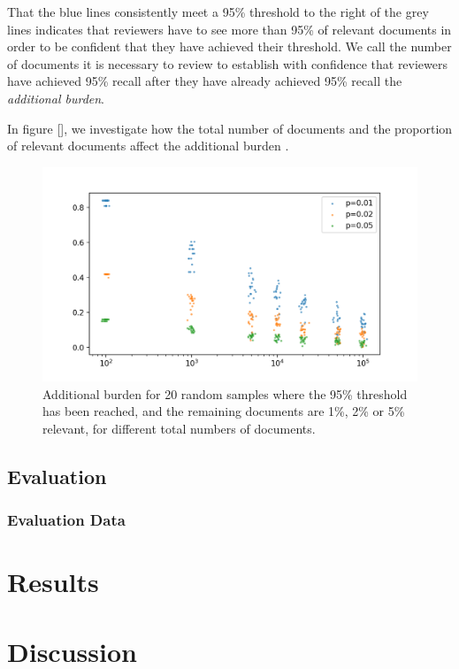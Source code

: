 \documentclass{bmcart}
\begin{document}
	That the blue lines consistently meet a 95\% threshold to the right of the grey lines indicates that reviewers have to see more than 95\% of relevant documents in order to be confident that they have achieved their threshold. We call the number of documents it is necessary to review to establish with confidence that reviewers have achieved 95\% recall after they have already achieved 95\% recall the \textit{additional burden}. 
	
	In figure [], we investigate how the total number of documents and the proportion of relevant documents affect the additional burden . 
	
	\begin{figure}
		\includegraphics[width=\linewidth]{../images/additional_burden}
		\caption{Additional burden for 20 random samples where the 95\% threshold has been reached, and the remaining documents are 1\%, 2\% or 5\% relevant, for different total numbers of documents.}
		\label{additional-burden}
	\end{figure}
	
	\subsection*{Evaluation}
	
	\subsubsection*{Evaluation Data}
	
	\section*{Results}
	
	\section*{Discussion}
	
\end{document}
